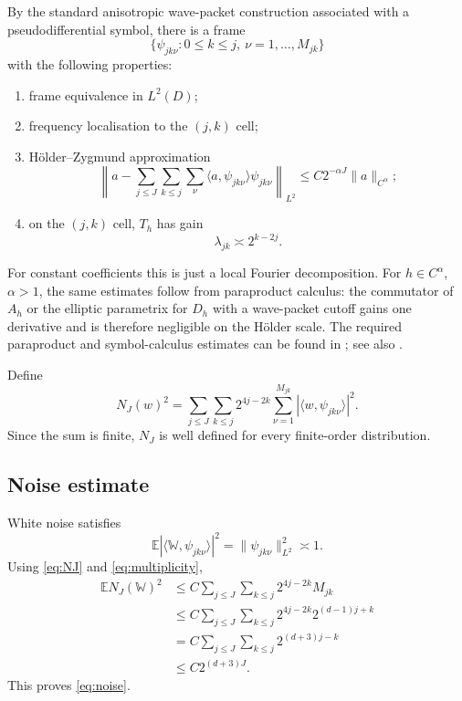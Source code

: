\documentclass[11pt,a4paper]{article}
\theoremstyle{remark}
\numberwithin{equation}{section}
\newcommand{\E}{\mathbb{E}}
\newcommand{\W}{\mathbb{W}}
\begin{document}
By the standard anisotropic wave-packet construction associated with a
pseudodifferential symbol, there is a frame
\[
\{\psi_{jk\nu}:0\leq k\leq j,\ \nu=1,\ldots,M_{jk}\}
\]
with the following properties:
\begin{enumerate}
\item frame equivalence in $L^2(D)$;
\item frequency localisation to the $(j,k)$ cell;
\item H\"older--Zygmund approximation
\begin{equation}\label{eq:frame-tail}
\left\|
a-\sum_{j\leq J}\sum_{k\leq j}\sum_{\nu}
\langle a,\psi_{jk\nu}\rangle\psi_{jk\nu}
\right\|_{L^2}
\leq
C2^{-\alpha J}\|a\|_{C^\alpha};
\end{equation}
\item on the $(j,k)$ cell, $T_h$ has gain
\begin{equation}\label{eq:local-gain}
\lambda_{jk}\asymp 2^{k-2j}.
\end{equation}
\end{enumerate}
For constant coefficients this is just a local Fourier decomposition. For
$h\in C^\alpha$, $\alpha>1$, the same estimates follow from paraproduct
calculus: the commutator of $A_h$ or the elliptic parametrix for $D_h$ with
a wave-packet cutoff gains one derivative and is therefore negligible on the
H\"older scale. The required paraproduct and symbol-calculus estimates can
be found in \cite[Chapter 3]{TaylorTools}; see also
\cite[Chapter XVIII]{HormanderIII}.

Define
\begin{equation}\label{eq:NJ}
N_J(w)^2
=
\sum_{j\leq J}\sum_{k\leq j}
2^{4j-2k}
\sum_{\nu=1}^{M_{jk}}
|\langle w,\psi_{jk\nu}\rangle|^2.
\end{equation}
Since the sum is finite, $N_J$ is well defined for every finite-order
distribution.

\subsection{Noise estimate}

White noise satisfies
\[
\E|\langle\W,\psi_{jk\nu}\rangle|^2
=
\|\psi_{jk\nu}\|_{L^2}^2
\asymp 1.
\]
Using \eqref{eq:NJ} and \eqref{eq:multiplicity},
\begin{align*}
\E N_J(\W)^2
&\leq
C\sum_{j\leq J}\sum_{k\leq j}
2^{4j-2k}M_{jk}\\
&\leq
C\sum_{j\leq J}\sum_{k\leq j}
2^{4j-2k}2^{(d-1)j+k}\\
&=
C\sum_{j\leq J}\sum_{k\leq j}
2^{(d+3)j-k}\\
&\leq
C2^{(d+3)J}.
\end{align*}
This proves \eqref{eq:noise}.
\end{document}

